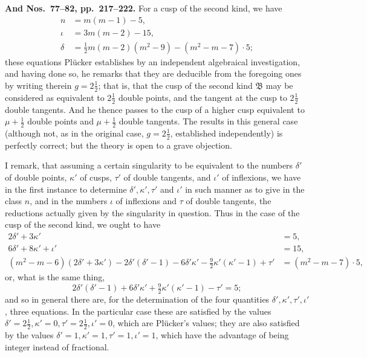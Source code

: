 \documentclass[11pt]{article}
\begin{document}
\medskip
\textbf{And Nos.~77--82, pp.~217--222.} For a cusp of the second kind, we have
\begin{align*}
n &= m(m-1) - 5,\\
\iota &= 3m(m-2) - 15,\\
\delta &= \tfrac{1}{2}m(m-2)(m^2 - 9) - (m^2 - m - 7)\cdot 5;
\end{align*}
these equations Pl\"ucker establishes by an independent algebraical investigation, and having done so, he remarks that they are deducible from the foregoing ones by writing therein $g = 2\tfrac{1}{2}$; that is, that the cusp of the second kind $\mathfrak{B}$ may be considered as equivalent to $2\tfrac{1}{2}$ double points, and the tangent at the cusp to $2\tfrac{1}{2}$ double tangents. And he thence passes to the cusp of a higher cusp equivalent to $\mu + \tfrac{1}{2}$ double points and $\mu + \tfrac{1}{2}$ double tangents. The results in this general case (although not, as in the original case, $g = 2\tfrac{1}{2}$, established independently) is perfectly correct; but the theory is open to a grave objection.

I remark, that assuming a certain singularity to be equivalent to the numbers $\delta'$ of double points, $\kappa'$ of cusps, $\tau'$ of double tangents, and $\iota'$ of inflexions, we have in the first instance to determine $\delta', \kappa', \tau'$ and $\iota'$ in such manner as to give in the class $n$, and in the numbers $\iota$ of inflexions and $\tau$ of double tangents, the reductions actually given by the singularity in question. Thus in the case of the cusp of the second kind, we ought to have
\begin{align*}
2\delta' + 3\kappa' &= 5,\\
6\delta' + 8\kappa' + \iota' &= 15,\\
(m^2 - m - 6)(2\delta' + 3\kappa') - 2\delta'(\delta' - 1) - 6\delta'\kappa' - \tfrac{9}{2}\kappa'(\kappa' - 1) + \tau' &= (m^2 - m - 7)\cdot 5,
\end{align*}
or, what is the same thing,
\[ 2\delta'(\delta' - 1) + 6\delta'\kappa' + \tfrac{9}{2}\kappa'(\kappa' - 1) - \tau' = 5; \]
and so in general there are, for the determination of the four quantities $\delta', \kappa', \tau', \iota'$, three equations. In the particular case these are satisfied by the values $\delta' = 2\tfrac{1}{2}, \kappa' = 0, \tau' = 2\tfrac{1}{2}, \iota' = 0$, which are Pl\"ucker's values; they are also satisfied by the values $\delta' = 1, \kappa' = 1, \tau' = 1, \iota' = 1$, which have the advantage of being integer instead of fractional.
\end{document}
